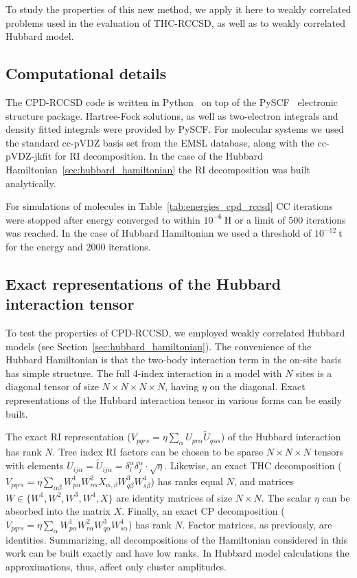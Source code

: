 To study the properties of this new method, we apply it here to weakly 
correlated problems used in the evaluation of 
THC-RCCSD,\cite{schutski2017tensor} as well as to weakly correlated Hubbard 
model. 

\subsection{Computational details}
The CPD-RCCSD code is written in Python~\cite{van2007python} on top of the 
PySCF~\cite{sun2017python} electronic structure package. Hartree-Fock 
solutions, as well as two-electron integrals and density fitted integrals were 
provided by PySCF. For molecular systems we used the standard cc-pVDZ basis set 
from the EMSL database,\cite{schuchardt2007basis} along with the cc-pVDZ-jkfit 
for RI decomposition. In the case of the Hubbard 
Hamiltonian~\ref{sec:hubbard_hamiltonian}
the RI decomposition was built analytically.

For simulations of molecules in Table~\ref{tab:energies_cpd_rccsd} CC iterations 
were stopped after energy converged to within $10^{-6}~\mathrm{H}$ or a limit 
of 500 iterations was reached. In the case of Hubbard Hamiltonian we used a 
threshold of $10^{-12}~\mathrm{t}$ for the energy and 2000 iterations.

\subsection{Exact representations of the Hubbard interaction tensor}
To test the properties of CPD-RCCSD, we employed weakly correlated 
Hubbard models (see Section~\ref{sec:hubbard_hamiltonian}). 
The convenience of the Hubbard Hamiltonian is that the two-body interaction term 
in the on-site basis has simple structure. The full 4-index interaction in a 
model with $N$ sites is a diagonal tensor of size $N\times N\times N \times N$, 
having $\eta$ on the diagonal. Exact representations of the Hubbard interaction 
tensor in various forms can be easily built.

The exact RI representation ($V_{pqrs} = 
\eta \sum_{\alpha} U_{pr\alpha} \tilde{U}_{qs\alpha}$) of the Hubbard 
interaction has rank $N$. Tree index RI factors can be chosen to be sparse $N 
\times N \times N$ tensors with elements $U_{ij\alpha} = \tilde{U}_{ij\alpha} 
= \delta_{i}^{\alpha} \delta_{j}^{\alpha} \cdot \sqrt{\eta}$. Likewise, an 
exact THC decomposition ($V_{pqrs} = \eta \sum_{\alpha \beta} W^{1}_{p\alpha} 
W^{2}_{r\alpha} X_{\alpha, \beta} W^{3}_{q\beta} W^{4}_{s\beta}$) has ranks 
equal $N$, and matrices $W \in \{W^{1}, W^{2}, W^{3}, W^{4}, X\}$ are identity 
matrices of size $N \times N$. The scalar $\eta$ can be absorbed into the 
matrix $X$. Finally, an exact CP decomposition ($V_{pqrs} = \eta \sum_{\alpha} 
W^{1}_{p\alpha} W^{2}_{r\alpha} W^{3}_{q\alpha} W^{4}_{s\alpha}$) has rank $N$.
Factor matrices, as previously, are identities. Summarizing, all decompositions 
of the Hamiltonian considered in this work can be built exactly and have low 
ranks. In Hubbard model calculations the approximations, thus, affect only 
cluster amplitudes.

